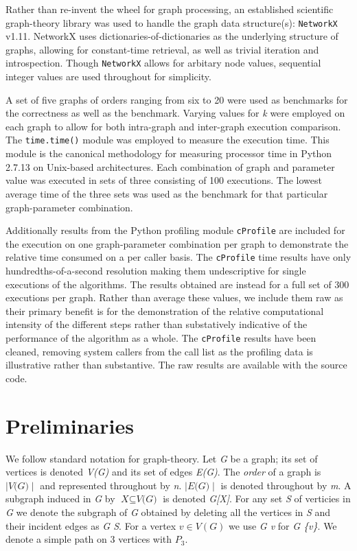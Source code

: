\documentclass[11pt]{article}
\newcommand{\inlinecode}{\texttt}
\begin{document}
Rather than re-invent the wheel for graph processing, an established scientific graph-theory library was used to handle the graph data structure(s): \inlinecode{NetworkX} v1.11. NetworkX uses dictionaries-of-dictionaries as the underlying structure of graphs, allowing for constant-time retrieval, as well as trivial iteration and introspection. Though \inlinecode{NetworkX} allows for arbitary node values, sequential integer values are used throughout for simplicity.

A set of five graphs of orders ranging from six to 20 were used as benchmarks for the correctness as well as the benchmark. Varying values for \textit{k} were employed on each graph to allow for both intra-graph and inter-graph execution comparison. The \inlinecode{time.time()} module was employed to measure the execution time. This module is the canonical methodology for measuring processor time in Python 2.7.13 on Unix-based architectures. Each combination of graph and parameter value was executed in sets of three consisting of 100 executions. The lowest average time of the three sets was used as the benchmark for that particular graph-parameter combination.

Additionally results from the Python profiling module \inlinecode{cProfile} are included for the execution on one graph-parameter combination per graph to demonstrate the relative time consumed on a per caller basis. The \inlinecode{cProfile} time results have only hundredths-of-a-second resolution making them undescriptive for single executions of the algorithms. The results obtained are instead for a full set of 300 executions per graph. Rather than average these values, we include them raw as their primary benefit is for the demonstration of the relative computational intensity of the different steps rather than substatively indicative of the performance of the algorithm as a whole. The \inlinecode{cProfile} results have been cleaned, removing system callers from the call list as the profiling data is illustrative rather than substantive. The raw results are available with the source code.

\listoftables

\section{Preliminaries}
\label{sec:prelim}
We follow standard notation for graph-theory. Let \textit{G} be a graph; its set of vertices is denoted \textit{V(G)} and its set of edges \textit{E(G)}. The \textit{order} of a graph is $\mid\textit{V(G)}\mid$ and represented throughout by \textit{n}. $\mid\textit{E(G)}\mid$ is denoted throughout by \textit{m}. A subgraph induced in \textit{G} by $\textit{X}\subseteq\textit{V(G)}$ is denoted \textit{G[X]}. For any set \textit{S} of verticies in \textit{G} we denote the subgraph of \textit{G} obtained by deleting all the vertices in \textit{S} and their incident edges as \textit{G \em S}. For a vertex $\textit{v}\in{V(G)}$ we use \textit{G \em v} for \textit{G \em \{v\}}. We denote a simple path on 3 vertices with \textit{$P_3$}.
\end{document}
